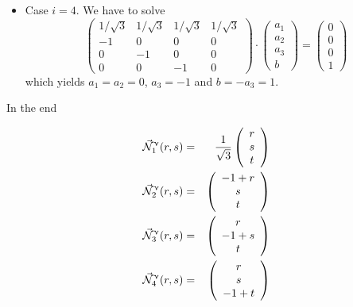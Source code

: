 \begin{itemize}
\item Case $i=4$. We have to solve
\[
\left(\begin{array}{cccc}
1/\sqrt3 & 1/\sqrt3 & 1/\sqrt3 & 1/\sqrt3 \\
-1 & 0 & 0 & 0 \\
0 & -1 & 0 & 0 \\
0 & 0 & -1 & 0
\end{array}\right)
\cdot
\left(\begin{array}{c}
a_1 \\ a_2 \\ a_3 \\ b
\end{array}\right)
=
\left(\begin{array}{c}
0 \\ 0 \\ 0 \\ 1
\end{array}\right)
\]
which yields $a_1=a_2=0$, $a_3=-1$ and $b=-a_3=1$.

\end{itemize}

In the end

\begin{mdframed}[backgroundcolor=blue!5]
\begin{eqnarray}
\vec{{\mathcal{N}}}^\upnu_1 (r,s) &=& \frac{1}{\sqrt3}
\left(\begin{array}{c} r \\s \\ t \end{array}\right) \nonumber\\
\vec{{\mathcal{N}}}^\upnu_2 (r,s) &=& 
\left(\begin{array}{c} -1+r \\ s \\t\end{array}\right) \nonumber\\
\vec{{\mathcal{N}}}^\upnu_3 (r,s) &=& 
\left(\begin{array}{c} r \\ -1+s \\t \end{array}\right) \nonumber\\
\vec{{\mathcal{N}}}^\upnu_4 (r,s) &=& 
\left(\begin{array}{c} r\\s\\-1+t \end{array}\right)
\end{eqnarray}
\end{mdframed}

